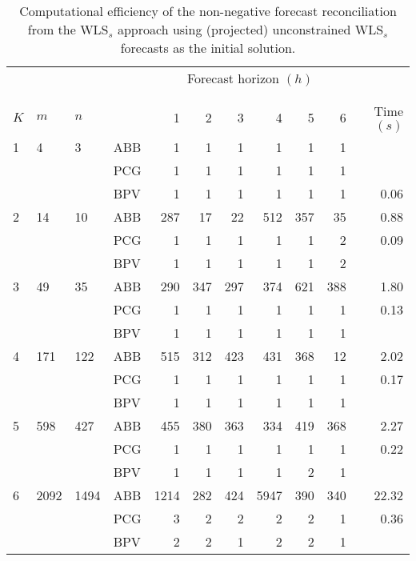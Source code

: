 \documentclass[11pt]{article}
\newcommand{\0}{\phantom{0}}
\begin{document}
\begin{table}[ht]
	\small
	\tabcolsep=0.20cm
	\captionsetup{belowskip=0pt, aboveskip=4pt}
	\caption{Computational efficiency of the non-negative forecast reconciliation from the WLS$_{s}$ approach using (projected) unconstrained WLS$_{s}$ forecasts as the initial solution.}
	\label{tbl:perfnnwlsp}
	\centering
	\begin{threeparttable}
		\begin{tabular}{llllrrrrrrr}
			\toprule
			& & & & \multicolumn{6}{c}{Forecast horizon $(h)$}\\[-0.4cm]\\\cline{5-10}\\[-0.3cm]
			$K$ & $m$ & $n$ & & 1 & 2 & 3 & 4 & 5 & 6 & Time $(s)$\\
			\midrule
			1 & 4 & 3 & ABB & 1 & 1 & 1 & 1 & 1 & 1 & \bm{$0.03$} \\
			& & & PCG & 1 & 1 & 1 & 1 & 1 & 1 & \bm{$0.03$} \\
			& & & BPV & 1 & 1 & 1 & 1 & 1 & 1 & 0.06 \\
			\midrule
			2 & 14 & 10 & ABB & 287 & 17 & 22 & 512 & 357 & 35 & 0.88 \\
			& & & PCG & 1 & 1 & 1 & 1 & 1 & 2 & 0.09 \\
			& & & BPV & 1 & 1 & 1 & 1 & 1 & 2 & \bm{$0.08$} \\
			\midrule
			3 & 49 & 35 & ABB & 290 & 347 & 297 & 374 & 621 & 388 & 1.80 \\
			& & & PCG & 1 & 1 & 1 & 1 & 1 & 1 & 0.13 \\
			& & & BPV & 1 & 1 & 1 & 1 & 1 & 1 & \bm{$0.07$} \\
			\midrule
			4 & 171 & 122 & ABB & 515 & 312 & 423 & 431 & 368 & 12 & 2.02 \\
			& & & PCG & 1 & 1 & 1 & 1 & 1 & 1 & 0.17 \\
			& & & BPV & 1 & 1 & 1 & 1 & 1 & 1 & \bm{$0.09$} \\
			\midrule
			5 & 598 & 427 & ABB & 455 & 380 & 363 & 334 & 419 & 368 & 2.27 \\
			& & & PCG & 1 & 1 & 1 & 1 & 1 & 1 & 0.22 \\
			& & & BPV & 1 & 1 & 1 & 1 & 2 & 1 & \bm{$0.12$} \\
			\midrule
			6 & 2092 & 1494 & ABB & 1214 & 282 & 424 & 5947 & 390 & 340 & 22.32 \\
			& & & PCG & 3 & 2 & 2 & 2 & 2 & 1 & 0.36 \\
			& & & BPV & 2 & 2 & 1 & 2 & 2 & 1 & \bm{$0.17$} \\

\end{tabular}
\end{threeparttable}
\end{table}
\end{document}
